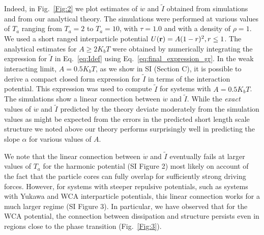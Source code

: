 \documentclass[superscriptaddress, twocolumn, prl, longbibliography, nofootinbib]{revtex4-1}
\begin{document}
Indeed, in Fig.~\ref{Fig:2} we plot estimates of $\dot{w}$ and $\tilde I$ obtained from simulations and from our analytical theory. The simulations were performed at various values of $T_a$ ranging from $T_a=2$ to $T_a=10$, with $\tau=1.0$ and with a density of $\rho=1$. We used a short ranged interparticle potential $U({\bf r})=A (1- r)^2, r\leq 1$. The analytical estimates for $A\geq 2 K_bT$ were obtained by numerically integrating the expression for $\tilde I$ in Eq.~\ref{eq:Idef} using Eq.~\ref{eq:final_expression_gr}. In the weak interacting limit, $A=0.5 K_b T$, as we show in SI (Section C), it is possible to derive a compact closed form expression for $\tilde I$ in terms of the interaction potential. This expression was used to compute $\tilde I$ for systems with $A=0.5 K_b T$. The simulations show a linear connection between $\dot{w}$ and $\tilde I$. While the \textit{exact} values of $\dot{w}$ and $\tilde I$ predicted by the theory deviate moderately from the simulation values \textendash as might be expected from the errors in the predicted short length scale structure we noted above \textendash our theory performs surprisingly well in predicting the slope $\alpha$ for various values of $A$. 

We note that the linear connection between $\dot{w}$ and $\tilde I$ eventually fails at larger values of $T_a$ for the harmonic potential (SI Figure 2) most likely on account of the fact that the particle cores can fully overlap for sufficiently strong driving forces. However, for systems with steeper repulsive potentials, such as systems with Yukawa and WCA interparticle potentials, this linear connection works for a much larger regime (SI Figure 3). In particular, we have observed that for the WCA potential, the connection between dissipation and structure persists even in regions close to the phase transition (Fig.~\ref{Fig:3}). 


\end{document}
